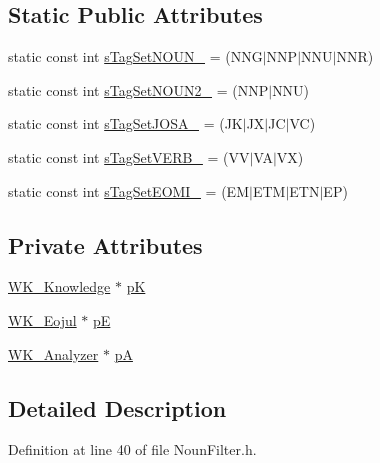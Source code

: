 \subsection*{Static Public Attributes}
\begin{CompactItemize}
\item 
static const int \hyperlink{classla__manager_1_1KoreanNounFilter_39fcd85a5f34abb008ce24e7918f98ee}{sTagSetNOUN\_\-} = (NNG$|$NNP$|$NNU$|$NNR)
\item 
static const int \hyperlink{classla__manager_1_1KoreanNounFilter_c9e130d7190ad4b4b1034370b9b601f2}{sTagSetNOUN2\_\-} = (NNP$|$NNU)
\item 
static const int \hyperlink{classla__manager_1_1KoreanNounFilter_297deec22f0c84a6f16e612f531c4485}{sTagSetJOSA\_\-} = (JK$|$JX$|$JC$|$VC)
\item 
static const int \hyperlink{classla__manager_1_1KoreanNounFilter_a462e3d26dce41fdf7c40e84b5aaa842}{sTagSetVERB\_\-} = (VV$|$VA$|$VX)
\item 
static const int \hyperlink{classla__manager_1_1KoreanNounFilter_bc755f0dfcfcfa1000d573d9049aea2d}{sTagSetEOMI\_\-} = (EM$|$ETM$|$ETN$|$EP)
\end{CompactItemize}
\subsection*{Private Attributes}
\begin{CompactItemize}
\item 
\hyperlink{classWK__Knowledge}{WK\_\-Knowledge} $\ast$ \hyperlink{classla__manager_1_1KoreanNounFilter_9da3dab8d3dafb70aee2869e892c02fd}{pK}
\item 
\hyperlink{classWK__Eojul}{WK\_\-Eojul} $\ast$ \hyperlink{classla__manager_1_1KoreanNounFilter_48a4995bc41a46eed59f1362bf2ff1af}{pE}
\item 
\hyperlink{classWK__Analyzer}{WK\_\-Analyzer} $\ast$ \hyperlink{classla__manager_1_1KoreanNounFilter_479d20d289d8d2bef499469d43a2c2f8}{pA}
\end{CompactItemize}


\subsection{Detailed Description}


Definition at line 40 of file NounFilter.h.

